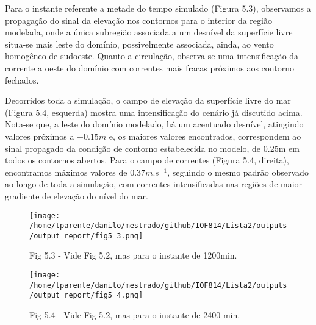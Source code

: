 \documentclass[11pt]{article}
\makeatletter
\def\maxwidth{\ifdim\Gin@nat@width>\linewidth\linewidth
    \else\Gin@nat@width\fi}
\let\Oldincludegraphics\includegraphics
\renewcommand{\includegraphics}[1]{\Oldincludegraphics[width=.8\maxwidth]{#1}}
\makeatother
\begin{document}
Para o instante referente a metade do tempo simulado (Figura 5.3),
observamos a propagação do sinal da elevação nos contornos para o
interior da região modelada, onde a única subregião associada a um
desnível da superfície livre situa-se mais leste do domínio,
possivelmente associada, ainda, ao vento homogêneo de sudoeste. Quanto a
circulação, observa-se uma intensificação da corrente a oeste do domínio
com correntes mais fracas próximos aos contorno fechados.

Decorridos toda a simulação, o campo de elevação da superfície livre do
mar (Figura 5.4, esquerda) mostra uma intensificação do cenário já
discutido acima. Nota-se que, a leste do domínio modelado, há um
acentuado desnível, atingindo valores próximos a \(-0.15m\) e, os
maiores valores encontrados, correspondem ao sinal propagado da condição
de contorno estabelecida no modelo, de 0.25m em todos os contornos
abertos. Para o campo de correntes (Figura 5.4, direita), encontramos
máximos valores de \(0.37 m.s^{-1}\), seguindo o mesmo padrão observado
ao longo de toda a simulação, com correntes intensificadas nas regiões
de maior gradiente de elevação do nível do mar.

\begin{figure}[!ht]
\centering
\centerline{\hbox{\texttt{[image: /home/tparente/danilo/mestrado/github/IOF814/Lista2/outputs/output\_report/fig5\_3.png]}}}
\caption{Fig 5.3 - Vide Fig 5.2, mas para o instante de 1200min.}
\label{fig5:3}
\end{figure}

\bigskip
\begin{figure}[!ht]
\centerline{\hbox{\texttt{[image: /home/tparente/danilo/mestrado/github/IOF814/Lista2/outputs/output\_report/fig5\_4.png]}}}
\caption{Fig 5.4 -  Vide Fig 5.2, mas para o instante de 2400 min.}
\label{fig5:4}
\end{figure}
\bigskip


    
\end{document}
